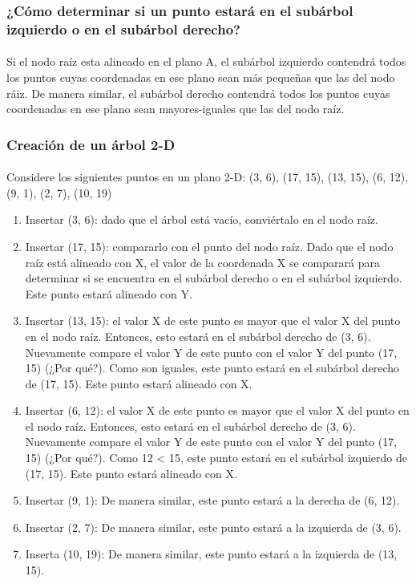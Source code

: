 \documentclass{article}
\begin{document}
\subsubsection{¿Cómo determinar si un punto estará en el subárbol izquierdo o en el subárbol derecho?}
\paragraph{}
Si el nodo raíz esta alineado en el plano A, el subárbol izquierdo contendrá todos los puntos cuyas coordenadas en ese plano sean más pequeñas que las del nodo ráiz. De manera similar, el subárbol derecho contendrá todos los puntos cuyas coordenadas en ese plano sean mayores-iguales que las del nodo raíz.

\subsubsection{Creación de un árbol 2-D}
\paragraph{}
Considere los siguientes puntos en un plano 2-D:
(3, 6), (17, 15), (13, 15), (6, 12), (9, 1), (2, 7), (10, 19)

\begin{enumerate}
	\item Insertar (3, 6): dado que el árbol está vacío, conviértalo en el nodo raíz.
	\item Insertar (17, 15): compararlo con el punto del nodo raíz. Dado que el nodo raíz está alineado con X, el valor de la coordenada X se comparará para determinar si se encuentra en el subárbol derecho o en el subárbol izquierdo. Este punto estará alineado con Y.
	\item Insertar (13, 15): el valor X de este punto es mayor que el valor X del punto en el nodo raíz. Entonces, esto estará en el subárbol derecho de (3, 6). Nuevamente compare el valor Y de este punto con el valor Y del punto (17, 15) (¿Por qué?). Como son iguales, este punto estará en el subárbol derecho de (17, 15). Este punto estará alineado con X.
	\item Insertar (6, 12): el valor X de este punto es mayor que el valor X del punto en el nodo raíz. Entonces, esto estará en el subárbol derecho de (3, 6). Nuevamente compare el valor Y de este punto con el valor Y del punto (17, 15) (¿Por qué?). Como 12 < 15, este punto estará en el subárbol izquierdo de (17, 15). Este punto estará alineado con X.
	\item Insertar (9, 1): De manera similar, este punto estará a la derecha de (6, 12).
	\item Insertar (2, 7): De manera similar, este punto estará a la izquierda de (3, 6).
	\item Inserta (10, 19): De manera similar, este punto estará a la izquierda de (13, 15).
\end{enumerate}
\end{document}
